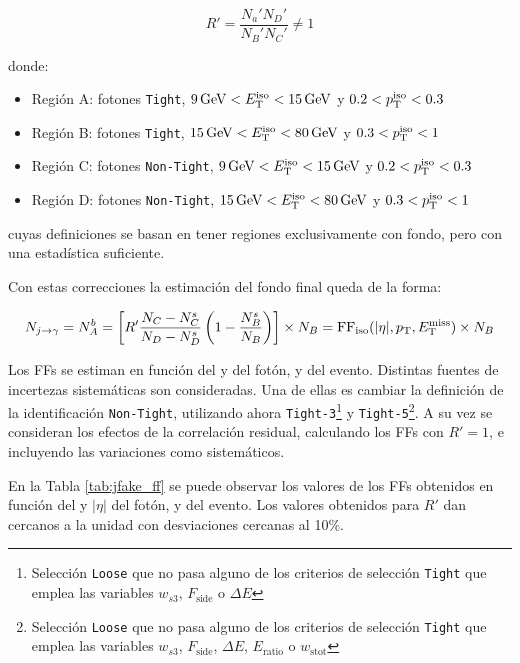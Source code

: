 \begin{equation}
  R' = \frac{N_a' N_D'}{N_B' N_C'} \neq 1
\end{equation}

\noindent
donde:
\begin{itemize}
  \item Región A: fotones \texttt{Tight}, $9\,\text{GeV}<E_{\text{T}}^{\text{iso}}<15\,\text{GeV}$ y $0.2<p_{\text{T}}^{\text{iso}}<0.3$
  \item Región B: fotones \texttt{Tight}, $15\,\text{GeV}<E_{\text{T}}^{\text{iso}}<80\,\text{GeV}$ y $0.3<p_{\text{T}}^{\text{iso}}<1$
  \item Región C: fotones \texttt{Non-Tight}, $9\,\text{GeV}<E_{\text{T}}^{\text{iso}}<15\,\text{GeV}$ y $0.2<p_{\text{T}}^{\text{iso}}<0.3$
  \item Región D: fotones \texttt{Non-Tight}, $15\,\text{GeV}<E_{\text{T}}^{\text{iso}}<80\,\text{GeV}$ y $0.3<p_{\text{T}}^{\text{iso}}<1$
\end{itemize}

\noindent
cuyas definiciones se basan en tener regiones exclusivamente con fondo, pero con una estadística suficiente.

Con estas correcciones la estimación del fondo final queda de la forma:

\begin{equation}
    N_{j\to\gamma} = N_A^b = \left[R' \frac{N_C - N_C^s}{N_D - N_D^s} \left( 1 - \frac{N_B^s}{N_B} \right)  \right] \times N_B = \text{FF}_{\text{iso}}(|\eta|, p_{\text{T}}, E_{\text{T}}^{\text{miss}}) \times N_B \\
\end{equation}

Los FFs se estiman en función del \pt y \absEta del fotón, y \met del evento. Distintas fuentes de incertezas sistemáticas son consideradas. 
Una de ellas es cambiar la definición de la identificación \texttt{Non-Tight}, utilizando ahora \texttt{Tight-3}\footnote{Selección \texttt{Loose} que no pasa alguno de los criterios de selección \texttt{Tight} que emplea las variables $w_{s3}$, $F_{\text{side}}$ o $\Delta E$} y \texttt{Tight-5}\footnote{Selección \texttt{Loose} que no pasa alguno de los criterios de selección \texttt{Tight} que emplea las variables $w_{s3}$, $F_{\text{side}}$, $\Delta E$, $E_{\text{ratio}}$ o $w_{\text{stot}}$}. A su vez se consideran los efectos de la correlación residual, calculando los FFs con $R'=1$, e incluyendo las variaciones como sistemáticos.

En la Tabla \ref{tab:jfake_ff} se puede observar los valores de los FFs obtenidos en función del \pt y $|\eta|$ del fotón, y \met del evento. Los valores obtenidos para $R'$ dan cercanos a la unidad con desviaciones cercanas al 10\%.

